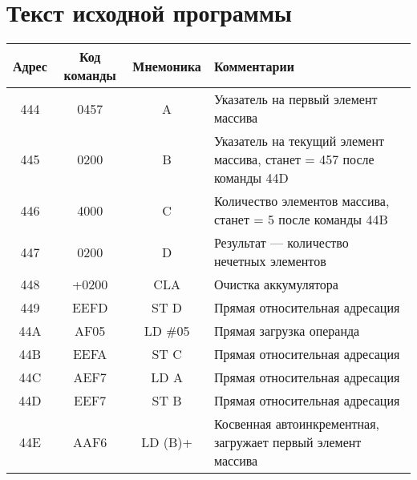 \section{Текст исходной программы}
\begin{table}[h!]
    \centering
    \begin{longtable}{| c | c | c | p{9.5cm} |}
        \hline
        \small
        Адрес & Код команды & Мнемоника           & Комментарии                                                                      \\
        \hline
        \hline
        444   & 0457        & A                   & Указатель на первый элемент массива                                      \\
        445   & 0200        & B                   & Указатель на текущий элемент массива, станет = 457 после команды 44D      \\
        446   & 4000        & C                   & Количество элементов массива, станет = 5 после команды 44B               \\
        447   & 0200        & D                   & Результат --- количество нечетных элементов \\
        \hline
        \hline
        448   & +0200       & CLA                 & Очистка аккумулятора                                                             \\
        449   & EEFD        & ST D                & Прямая относительная адресация                                                    \\ %
        44A   & AF05        & LD \#05             & Прямая загрузка операнда                                                         \\ %
        44B   & EEFA        & ST C                & Прямая относительная адресация                                                    \\ %
        44C   & AEF7        & LD A                & Прямая относительная адресация                                                    \\ %
        44D   & EEF7        & ST B                & Прямая относительная адресация                                                    \\ %
        \hline
        44E   & AAF6        & LD (B)+             & Косвенная автоинкрементная, загружает первый элемент массива                     \\

\end{longtable}
\end{table}
